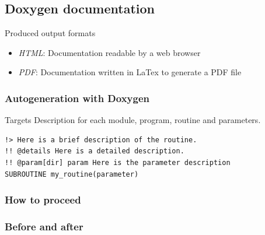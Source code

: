 \documentclass[10p]{beamer}
\begin{document}
\subsection{Doxygen documentation}
\begin{frame}[fragile]
\begin{block}{Produced output formats}
\begin{itemize}
\item \textit{HTML}: Documentation readable by a web browser
\item \textit{PDF}: Documentation written in LaTex to generate a PDF file
\end{itemize}
\end{block}

\frametitle{Autogeneration with Doxygen}
\begin{block}{Targets}
Description for each module, program, routine and parameters.
\end{block}

\begin{example}
\begin{lstlisting}
!> Here is a brief description of the routine.
!! @details Here is a detailed description.
!! @param[dir] param Here is the parameter description
SUBROUTINE my_routine(parameter)
\end{lstlisting}
\end{example}
\end{frame}

\begin{frame}
\frametitle{How to proceed}
\end{frame}
\begin{frame}[allowframebreaks]
\frametitle{Before and after}
\end{frame}
\end{document}
